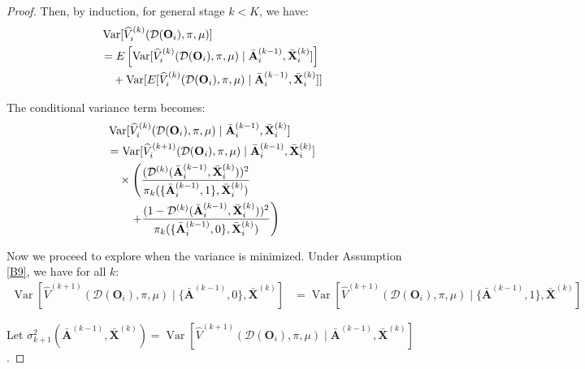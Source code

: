 \documentclass[11pt]{article}
\theoremstyle{referenceplain}
\theoremstyle{referencedefinition}
\theoremstyle{referenceremark}
\begin{document}
\begin{proof}

Then, by induction, for general stage $k < K$, we have:
\begin{align}
    &\operatorname{Var}[\widehat{V}_i^{(k)}(\mathcal{D}(\mathbf{O}_i),\pi,\mu)]\notag\\
    &= E\left[\operatorname{Var}[\widehat{V}_i^{(k)}(\mathcal{D}(\mathbf{O}_i),\pi,\mu) \mid \bar{\mathbf{A}}_i^{(k-1)}, \bar{\mathbf{X}}_i^{(k)}]\right]\notag\\
    &\quad + \operatorname{Var}[E[\widehat{V}_i^{(k)}(\mathcal{D}(\mathbf{O}_i),\pi,\mu) \mid \bar{\mathbf{A}}_i^{(k-1)}, \bar{\mathbf{X}}_i^{(k)}]]
\end{align}

The conditional variance term becomes:
\begin{align}
    &\operatorname{Var}[\widehat{V}_i^{(k)}(\mathcal{D}(\mathbf{O}_i),\pi,\mu) \mid \bar{\mathbf{A}}_i^{(k-1)}, \bar{\mathbf{X}}_i^{(k)}]\notag\\
    &= \operatorname{Var}[\widehat{V}_i^{(k+1)}(\mathcal{D}(\mathbf{O}_i),\pi,\mu) \mid \bar{\mathbf{A}}_i^{(k-1)}, \bar{\mathbf{X}}_i^{(k)}]\notag\\
    &\quad \times \left(\frac{(\mathcal{D}^{(k)}(\bar{\mathbf{A}}_i^{(k-1)},\bar{\mathbf{X}}_i^{(k)}))^2}{\pi_k(\{\bar{\mathbf{A}}_i^{(k-1)},1\}, \bar{\mathbf{X}}_i^{(k)})}\right.\notag\\
    &\quad\quad\left.+ \frac{(1-\mathcal{D}^{(k)}(\bar{\mathbf{A}}_i^{(k-1)},\bar{\mathbf{X}}_i^{(k)}))^2}{\pi_k(\{\bar{\mathbf{A}}_i^{(k-1)},0\}, \bar{\mathbf{X}}_i^{(k)})}\right)
\end{align}


Now we proceed to explore when the variance is minimized. Under Assumption \ref{B9}, we have for all $k$:
\begin{align}
    \operatorname{Var}[\widehat{V}^{(k+1)}(\mathcal{D}(\mathbf{O}_i),\pi,\mu) \mid \{\bar{\mathbf{A}}^{(k-1)},0\}, \bar{\mathbf{X}}^{(k)}] &= \operatorname{Var}[\widehat{V}^{(k+1)}(\mathcal{D}(\mathbf{O}_i),\pi,\mu) \mid \{\bar{\mathbf{A}}^{(k-1)},1\}, \bar{\mathbf{X}}^{(k)}]
\end{align}

Let $\sigma^2_{k+1}(\bar{\mathbf{A}}^{(k-1)}, \bar{\mathbf{X}}^{(k)}) = \operatorname{Var}[\widehat{V}^{(k+1)}(\mathcal{D}(\mathbf{O}_i),\pi,\mu) \mid \bar{\mathbf{A}}^{(k-1)}, \bar{\mathbf{X}}^{(k)}]$.


\end{proof}
\end{document}
